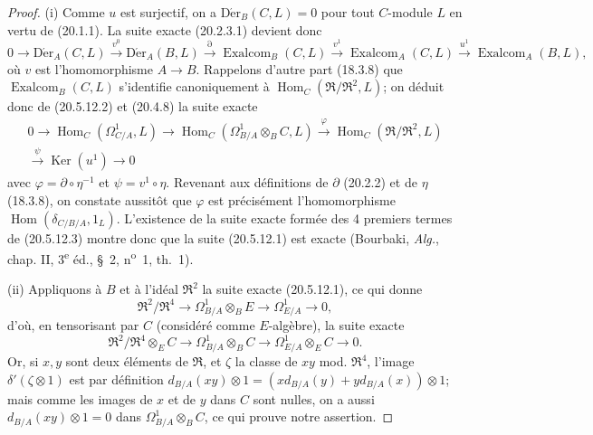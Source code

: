 \begin{proof}
(i) Comme $u$ est surjectif, on a $\operatorname{D\acute{e}r}_B(C,L)=0$ pour tout $C$-module
$L$ en vertu de (20.1.1). La suite exacte (20.2.3.1) devient donc
\begin{equation}
\tag{20.5.12.2}
\label{0.20.5.12.2-fr}
  0\longrightarrow\operatorname{D\acute{e}r}_A(C,L)\xrightarrow{v^0}\operatorname{D\acute{e}r}_A(B,L)
  \xrightarrow{\partial}\operatorname{Exalcom}_B(C,L)
  \xrightarrow{v^1}\operatorname{Exalcom}_A(C,L)
  \xrightarrow{u^1}\operatorname{Exalcom}_A(B,L),
\end{equation}
où $v$ est l'homomorphisme $A\to B$. Rappelons d'autre part (18.3.8) que
$\operatorname{Exalcom}_B(C,L)$ s'identifie canoniquement à
$\operatorname{Hom}_C(\mathfrak{R}/\mathfrak{R}^2,L)$; on déduit donc de (20.5.12.2)
et (20.4.8) la suite exacte
\begin{equation}
\tag{20.5.12.3}
\label{0.20.5.12.3-fr}
\begin{split}
  0\longrightarrow\operatorname{Hom}_C(\Omega^1_{C/A},L)
  \longrightarrow\operatorname{Hom}_C(\Omega^1_{B/A}\otimes_B C,L)
  \xrightarrow{\varphi}\operatorname{Hom}_C(\mathfrak{R}/\mathfrak{R}^2,L)\\
  \xrightarrow{\psi}\operatorname{Ker}(u^1)\longrightarrow 0
\end{split}
\end{equation}
avec $\varphi=\partial\circ\eta^{-1}$ et $\psi=v^1\circ\eta$. Revenant
aux définitions de $\partial$ (20.2.2) et de $\eta$ (18.3.8), on constate
aussitôt que $\varphi$ est précisément l'homomorphisme
$\operatorname{Hom}(\delta_{C/B/A},1_L)$. L'existence de la suite exacte formée des
4 premiers termes de (20.5.12.3) montre donc que la suite (20.5.12.1)
est exacte (Bourbaki, \emph{Alg.}, chap. II, 3\textsuperscript{e} éd.,
\S~2, n\textsuperscript{o}~1, th.~1).

\medskip
(ii) Appliquons à $B$ et à l'idéal $\mathfrak{R}^2$ la suite exacte
(20.5.12.1), ce qui donne
\begin{equation}
\tag{20.5.12.4}
\label{0.20.5.12.4-fr}
  \mathfrak{R}^2/\mathfrak{R}^4\longrightarrow
  \Omega^1_{B/A}\otimes_B E\longrightarrow\Omega^1_{E/A}\longrightarrow 0,
\end{equation}
d'où, en tensorisant par $C$ (considéré comme $E$-algèbre), la suite
exacte
\[
  \mathfrak{R}^2/\mathfrak{R}^4\otimes_E C\longrightarrow
  \Omega^1_{B/A}\otimes_B C\longrightarrow
  \Omega^1_{E/A}\otimes_E C\longrightarrow 0.
\]
Or, si $x,y$ sont deux éléments de $\mathfrak{R}$, et $\zeta$ la classe
de $xy$ mod. $\mathfrak{R}^4$, l'image
$\delta'(\zeta\otimes1)$ est par définition
$d_{B/A}(xy)\otimes1=(xd_{B/A}(y)+yd_{B/A}(x))\otimes1$; mais comme les
images de $x$ et de $y$ dans $C$ sont nulles, on a aussi
$d_{B/A}(xy)\otimes1=0$ dans $\Omega^1_{B/A}\otimes_B C$, ce qui prouve
notre assertion.


\end{proof}
